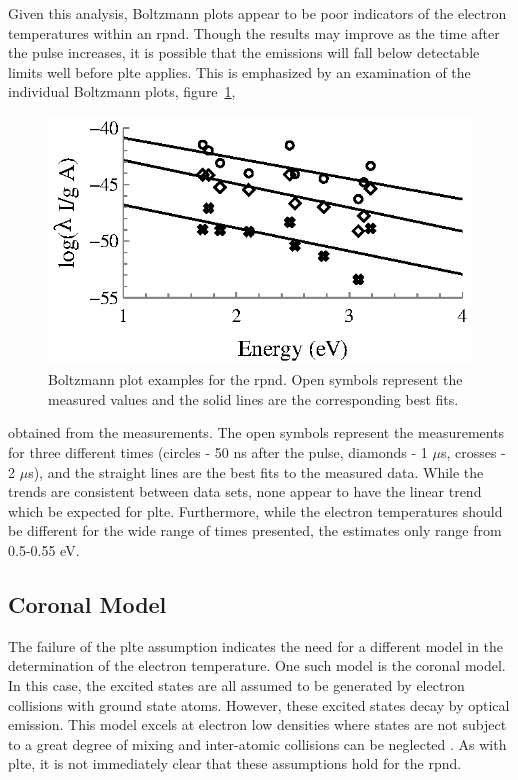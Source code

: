 Given this analysis, Boltzmann plots appear to be poor indicators of the
electron temperatures within an \acs{rpnd}. Though the results may improve as
the time after the pulse increases, it is possible that the emissions will fall
below detectable limits well before \acs{plte} applies. This is emphasized by an
examination of the individual Boltzmann plots, figure~\ref{fig:boltex},
\begin{figure}
  \centering
  \includegraphics{./chapters/emissions/figures/boltex.eps}
  \caption{Boltzmann plot examples for the \acs{rpnd}. Open symbols represent
  the measured values and the solid lines are the corresponding best fits.}
  \label{fig:boltex}
\end{figure}
obtained from the measurements. The open symbols represent the measurements for
three different times (circles - 50 ns after the pulse, diamonds - 1 $\mu$s,
crosses - 2 $\mu$s), and the straight lines are the best fits to the measured
data. While the trends are consistent between data sets, none appear to have the
linear trend which be expected for \acs{plte}. Furthermore, while the electron
temperatures should be different for the wide range of times presented, the
estimates only range from 0.5-0.55 eV.

\subsection{Coronal Model}

The failure of the \acs{plte} assumption indicates the need for a different
model in the determination of the electron temperature. One such model is the
coronal model. In this case, the excited states are all assumed to be generated
by electron collisions with ground state atoms. However, these excited states
decay by optical emission. This model excels at electron low densities where
states are not subject to a great degree of mixing and inter-atomic collisions
can be neglected \cite{Kunze2009}. As with \acs{plte}, it is not immediately
clear that these assumptions hold for the \acs{rpnd}.

